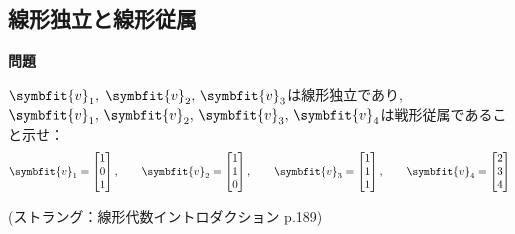 \subsection{線形独立と線形従属}
\noindent
\textbf{問題}\\

$\symbfit{v}_1,\;\symbfit{v}_2,\,\symbfit{v}_3$は線形独立であり,$\symbfit{v}_1,\,\symbfit{v}_2,\,\symbfit{v}_3,\,\symbfit{v}_4$は戦形従属であること示せ：
    \[
    \symbfit{v}_1 = \begin{bmatrix}1\\0\\1\end{bmatrix}, \qquad
    \symbfit{v}_2 = \begin{bmatrix}1\\1\\0\end{bmatrix}, \qquad
    \symbfit{v}_3 = \begin{bmatrix}1\\1\\1\end{bmatrix}, \qquad
    \symbfit{v}_4 = \begin{bmatrix}2\\3\\4\end{bmatrix}
    \]
\begin{flushright}
    (ストラング：線形代数イントロダクション p.189)
\end{flushright}
\noindent
{}

